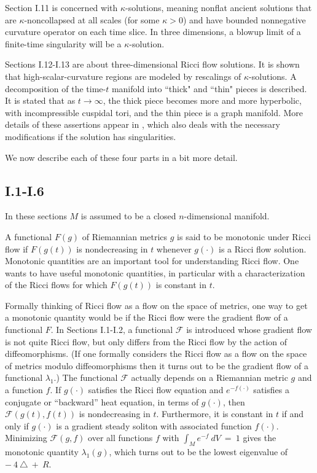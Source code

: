 Section I.11 is concerned with $\kappa$-solutions, meaning nonflat
ancient solutions that are $\kappa$-noncollapsed at all scales
(for some $\kappa > 0$) and have bounded nonnegative curvature
operator on each time slice. In three dimensions, a blowup limit of a
finite-time singularity will be a $\kappa$-solution.

Sections I.12-I.13 are about three-dimensional Ricci flow solutions.
It is shown that high-scalar-curvature regions are modeled by
rescalings of $\kappa$-solutions. A decomposition of the
time-$t$ manifold into ``thick" and ``thin" pieces is described.
It is stated that as $t \rightarrow \infty$, the thick piece becomes
more and more hyperbolic, with incompressible cuspidal tori, and the thin
piece is a graph manifold. More details of these assertions
appear in \cite{Perelman2}, which also
deals with the necessary modifications if the solution has singularities.

We now describe each of these four parts in a bit more detail.

\subsection{I.1-I.6}

In these sections $M$ is assumed to be a closed $n$-dimensional
manifold.

A functional $F(g)$ of Riemannian metrics $g$ is said to be monotonic
under Ricci flow if $F(g(t))$ is nondecreasing in $t$ whenever $g(\cdot)$ is
a Ricci flow solution.
Monotonic quantities are an important tool for understanding Ricci flow. One wants
to have useful monotonic quantities, in particular with a characterization
of the Ricci flows for which $F(g(t))$ is constant in $t$.

Formally thinking of Ricci flow as a flow on the space of
metrics, one way to get a monotonic quantity  would be if the Ricci flow
were the gradient flow of a functional $F$. In Sections I.1-I.2, a functional ${\mathcal F}$
is introduced whose gradient flow is not quite Ricci flow, but only
differs from the Ricci flow by the action of diffeomorphisms.
(If one formally considers the Ricci flow as a flow on the space of
metrics modulo diffeomorphisms then it turns out to be the gradient flow of a functional
$\lambda_1$.) The functional ${\mathcal F}$ actually depends on a Riemannian metric
$g$ and a function $f$. If $g(\cdot)$ satisfies the Ricci flow equation
and $e^{-f(\cdot)}$ satisfies a conjugate or ``backward''
heat equation, in terms of $g(\cdot)$, then
${\mathcal F}(g(t),f(t))$ is nondecreasing in $t$. Furthermore, it is
constant in $t$ if and only if $g(\cdot)$ is a gradient steady soliton with
associated function $f(\cdot)$. Minimizing ${\mathcal F}(g,f)$ over all
functions $f$ with $\int_M e^{-f} \: dV \: = \: 1$ gives the monotonic
quantity $\lambda_1(g)$, which turns out to be the
lowest eigenvalue of $- \: 4 \: \triangle \: + \: R$.

